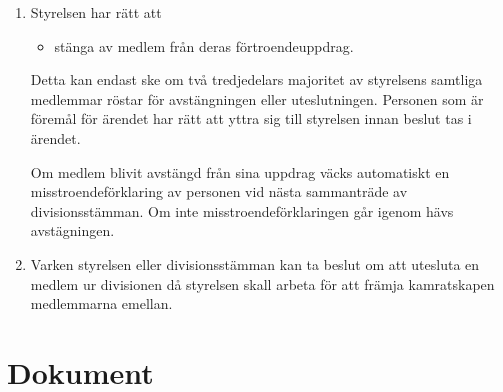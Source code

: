 \documentclass{dvd}
\begin{document}
\begin{enumerate}[label=\arabic* §, ref=\arabic*]
		\item Styrelsen har rätt att

		\begin{itemize}
			\item stänga av medlem från deras förtroendeuppdrag.
		\end{itemize}

		Detta kan endast ske om två tredjedelars majoritet av styrelsens samtliga medlemmar röstar för avstängningen eller uteslutningen.
		Personen som är föremål för ärendet har rätt att yttra sig till styrelsen innan beslut tas i ärendet.

		Om medlem blivit avstängd från sina uppdrag väcks automatiskt en misstroendeförklaring av personen vid nästa sammanträde av divisionsstämman.
		Om inte misstroendeförklaringen går igenom hävs avstägningen.

		\item Varken styrelsen eller divisionsstämman kan ta beslut om att utesluta en medlem ur divisionen då styrelsen skall arbeta för att främja kamratskapen medlemmarna emellan.
	\end{enumerate}

	\section{Dokument}
\end{document}

